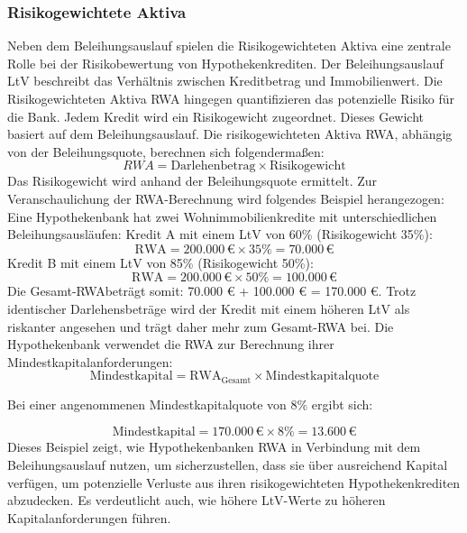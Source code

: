 \subsubsection{Risikogewichtete Aktiva}
Neben dem Beleihungsauslauf spielen die Risikogewichteten Aktiva eine zentrale Rolle bei der Risikobewertung von Hypothekenkrediten. Der Beleihungsauslauf \ac{LtV} beschreibt das Verhältnis zwischen Kreditbetrag und Immobilienwert. Die Risikogewichteten Aktiva \acs{RWA} hingegen quantifizieren das potenzielle Risiko für die Bank. Jedem Kredit wird ein Risikogewicht zugeordnet. Dieses Gewicht basiert auf dem Beleihungsauslauf. Die risikogewichteten Aktiva \acs{RWA}, abhängig von der Beleihungsquote, berechnen sich folgendermaßen:
\begin{equation}
    RWA = \text{Darlehenbetrag} \times \text{Risikogewicht}
\end{equation}
Das Risikogewicht wird anhand der Beleihungsquote ermittelt.
Zur Veranschaulichung der RWA-Berechnung wird folgendes Beispiel herangezogen:
Eine Hypothekenbank hat zwei Wohnimmobilienkredite mit unterschiedlichen Beleihungsausläufen:
Kredit A mit einem \ac{LtV} von 60\% (Risikogewicht 35\%):  
\[
\text{RWA} = 200.000 \, \text{€} \times 35\% = 70.000 \, \text{€}
\]  
Kredit B mit einem \ac{LtV} von 85\% (Risikogewicht 50\%):  
\[
\text{RWA} = 200.000 \, \text{€} \times 50\% = 100.000 \, \text{€}
\]
Die Gesamt-\acs{RWA}beträgt somit: 70.000 € + 100.000 € = 170.000 €.  
Trotz identischer Darlehensbeträge wird der Kredit mit einem höheren \ac{LtV} als riskanter angesehen und trägt daher mehr zum Gesamt-\acs{RWA} bei.
Die Hypothekenbank verwendet die \acs{RWA} zur Berechnung ihrer Mindestkapitalanforderungen:
\begin{equation}
    \text{Mindestkapital} = \text{RWA}_{\text{Gesamt}} \times \text{Mindestkapitalquote}
    \label{eq:min_capital}
    \end{equation}
    
    Bei einer angenommenen Mindestkapitalquote von 8\% ergibt sich:
    
    \begin{equation*}
    \text{Mindestkapital} = 170.000 \, \text{€} \times 8\% = 13.600 \, \text{€}
    \end{equation*}
Dieses Beispiel zeigt, wie Hypothekenbanken \acs{RWA} in Verbindung mit dem Beleihungsauslauf nutzen, um sicherzustellen, dass sie über ausreichend Kapital verfügen, um potenzielle Verluste aus ihren risikogewichteten Hypothekenkrediten abzudecken. Es verdeutlicht auch, wie höhere \ac{LtV}-Werte zu höheren Kapitalanforderungen führen.
